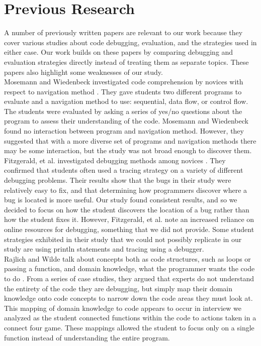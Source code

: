 \section{Previous Research}

A number of previously written papers are relevant to our work because they cover various studies about code debugging, evaluation, and the strategies used in either case. Our work builds on these papers by comparing debugging and evaluation strategies directly instead of treating them as separate topics. These papers also highlight some weaknesses of our study. \\

Mosemann and Wiedenbeck investigated code comprehension by novices with respect to navigation method \cite{mosemann2001}.
They gave students two different programs to evaluate and a navigation method to use: sequential, data flow, or control flow.
The students were evaluated by asking a series of yes/no questions about the program to assess their understanding of the code.
Mosemann and Wiedenbeck found no interaction between program and navigation method.
However, they suggested that with a more diverse set of programs and navigation methods there may be some interaction, but the study was not broad enough to discover them.\\

Fitzgerald, et al. investigated debugging methods among novices \cite{fitzgerald2008}.
They confirmed that students often used a tracing strategy on a variety of different debugging problems.
Their results show that the bugs in their study were relatively easy to fix, and that determining how programmers discover where a bug is located is more useful.
Our study found consistent results, and so we decided to focus on how the student discovers the location of a bug rather than how the student fixes it.
However, Fitzgerald, et al. note an increased reliance on online resources for debugging, something that we did not provide.
Some student strategies exhibited in their study that we could not possibly replicate in our study are using println statements and tracing using a debugger.\\

Rajlich and Wilde talk about concepts both as code structures, such as loops or passing a function, and domain knowledge, what the programmer wants the code to do \cite{1021348}.
From a series of case studies, they argued that experts do not understand the entirety of the code they are debugging, but simply map their domain knowledge onto code concepts to narrow down the code areas they must look at.
This mapping of domain knowledge to code appears to occur in interview we analyzed as the student connected functions within the code to actions taken in a connect four game.
These mappings allowed the student to focus only on a single function instead of understanding the entire program.\\

